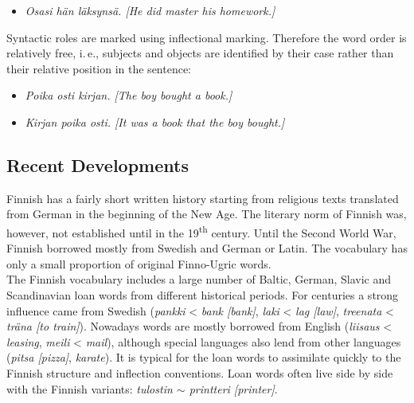 \begin{multicols}{2}
\begin{itemize}
\item \textit{\foreignlanguage{finnish}{\textit{Osasi hän läksynsä.}}
              [He did master his homework.]}
\end{itemize}

Syntactic roles are marked using inflectional marking. Therefore the word order
is relatively free, i.\,e., subjects and objects are identified by their case
rather than their relative position in the sentence:
\begin{itemize}
\item \textit{\foreignlanguage{finnish}{\textit{Poika osti kirjan.}}
              [The boy bought a book.]}

\item \textit{\foreignlanguage{finnish}{\textit{Kirjan poika osti.}}
              [It was a book that the boy bought.]}
\end{itemize}


\subsection{Recent Developments}

Finnish has a fairly short written history starting from religious texts
translated from German in the beginning of the New Age. The literary norm of
Finnish was, however, not established until in the 19\textsuperscript{th} century. Until the
Second World War, Finnish borrowed mostly from Swedish and German or Latin. The
vocabulary has only a small proportion of original Finno-Ugric words.\\
The Finnish vocabulary includes a large number of Baltic, German, Slavic and
Scandinavian loan words from different historical periods. For centuries a
strong influence came from Swedish
 ({\foreignlanguage{finnish}{\textit{pankki}}} < \textit{bank [bank]},
  {\foreignlanguage{finnish}{\textit{laki}}} < \textit{lag [law]},
  {\foreignlanguage{finnish}{\textit{treenata}}} < \textit{träna [to train]}).
Nowadays words are mostly borrowed from English
 ({\foreignlanguage{finnish}{\textit{liisaus}}} < \textit{leasing},
  {\foreignlanguage{finnish}{\textit{meili}}} < \textit{mail}),
although special languages also lend from
other languages
 (\textit{\foreignlanguage{finnish}{\textit{pitsa}} [pizza]},
  \textit{\foreignlanguage{finnish}{\textit{karate}}}).
It is typical for the loan words to
assimilate quickly to the Finnish structure and inflection conventions. Loan
words often live side by side with the Finnish variants:
\textit{\foreignlanguage{finnish}{\textit{tulostin}} $\sim$
        \foreignlanguage{finnish}{\textit{printteri}} [printer]}.


\end{multicols}

